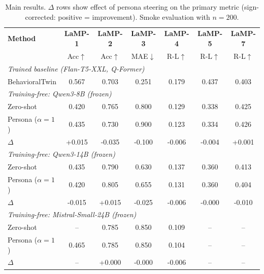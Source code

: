 \begin{table}[t]
\centering\small
\begin{tabular}{lcccccc}
\toprule
\textbf{Method} & \textbf{LaMP-1} & \textbf{LaMP-2} & \textbf{LaMP-3} & \textbf{LaMP-4} & \textbf{LaMP-5} & \textbf{LaMP-7} \\
 & Acc$\uparrow$ & Acc$\uparrow$ & MAE$\downarrow$ & R-L$\uparrow$ & R-L$\uparrow$ & R-L$\uparrow$ \\
\midrule
\multicolumn{7}{l}{\textit{Trained baseline (Flan-T5-XXL, Q-Former)}} \\
BehavioralTwin & 0.567 & 0.703 & 0.251 & 0.179 & 0.437 & 0.403 \\
\midrule
\multicolumn{7}{l}{\textit{Training-free: Qwen3-8B (frozen)}} \\
Zero-shot & 0.420 & 0.765 & 0.800 & 0.129 & 0.338 & 0.425 \\
Persona ($\alpha{=}1$) & 0.435 & 0.730 & 0.900 & 0.123 & 0.334 & 0.426 \\
$\Delta$ & +0.015 & -0.035 & -0.100 & -0.006 & -0.004 & +0.001 \\
\midrule
\multicolumn{7}{l}{\textit{Training-free: Qwen3-14B (frozen)}} \\
Zero-shot & 0.435 & 0.790 & 0.630 & 0.137 & 0.360 & 0.413 \\
Persona ($\alpha{=}1$) & 0.420 & 0.805 & 0.655 & 0.131 & 0.360 & 0.404 \\
$\Delta$ & -0.015 & +0.015 & -0.025 & -0.006 & -0.000 & -0.010 \\
\midrule
\multicolumn{7}{l}{\textit{Training-free: Mistral-Small-24B (frozen)}} \\
Zero-shot & -- & 0.785 & 0.850 & 0.109 & -- & -- \\
Persona ($\alpha{=}1$) & 0.465 & 0.785 & 0.850 & 0.104 & -- & -- \\
$\Delta$ & -- & +0.000 & -0.000 & -0.006 & -- & -- \\
\midrule
\bottomrule
\end{tabular}
\caption{Main results. $\Delta$ rows show effect of persona steering on the primary metric (sign-corrected: positive = improvement). Smoke evaluation with $n{=}200$.}
\label{tab:main}
\end{table}
